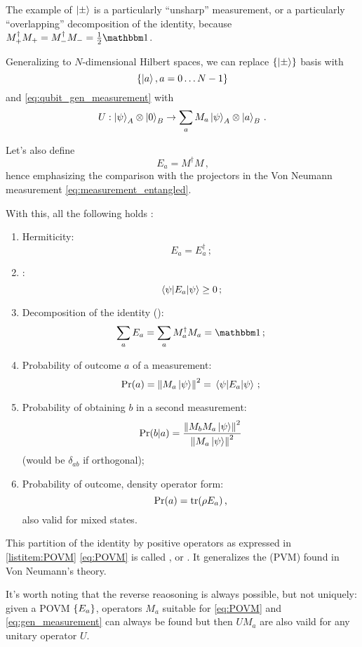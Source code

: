 The example of $\ket{\pm}$ is a particularly ``unsharp'' measurement,
or a particularly ``overlapping'' decomposition of the identity,
because $M_+^{\dagger}M_+ = M_-^{\dagger}M_- = \frac{1}{2}\idop$.

Generalizing to $N$-dimensional Hilbert spaces, we can replace
$\left\{\ket{\pm}\right\}$ basis with
\[
  \left\{\ket{a}, a = 0\ldots N-1\right\}
\]
and \eqref{eq:qubit_gen_measurement} with
\begin{equation}\label{eq:gen_measurement}
  U: \ket{\psi}_A \otimes \ket{0}_B \rightarrow \sum_a M_a\ket{\psi}_A \otimes \ket{a}_B
  \,\text{.}
\end{equation}

Let's also define
\[
  E_a = M^{\dagger}M \,\text{,}
\]
hence emphasizing the comparison with the projectors in the
Von Neumann measurement \eqref{eq:measurement_entangled}.

With this, all the following holds \parencite[Sec. 3.1]{PreskillNotes}:
\begin{enumerate}
  \item 
    Hermiticity: \[E_a = E_a^{\dagger}\,\text{;}\]
  \item
    : \[\expval{E_a}{\psi} \geq 0\,\text{;}\]  
  \item\label{listitem:POVM}
    Decomposition of the identity ():
    \begin{equation}\label{eq:POVM}
      \sum_a E_a = \sum_a M_a^{\dagger}M_a = \idop \,\text{;}
    \end{equation}
  \item
    Probability of outcome $a$ of a measurement:
    \[\Pr(a) = \norm{M_a\ket{\psi}}^2 = \expval{E_a}{\psi}\,\text{;}\]
  \item
    Probability of obtaining $b$ in a second measurement:
    \[\Pr(b|a) = \frac{\norm{M_bM_a\ket{\psi}}^2}{\norm{M_a\ket{\psi}}^2}\]
    (would be $\delta_{ab}$ if orthogonal);
  \item
    Probability of outcome, density operator form:
    \[\Pr(a) = \tr(\rho E_a)\,\text{,}\]
    also valid for mixed states.
\end{enumerate}

This partition of the identity by positive operators
as expressed in \ref{listitem:POVM} \eqref{eq:POVM} is called
, or .
It generalizes the  (PVM)
found in Von Neumann's theory.

It's worth noting that the reverse reaosoning is always possible,
but not uniquely:
given a POVM $\left\{E_a\right\}$, operators $M_a$
suitable for \eqref{eq:POVM} and \eqref{eq:gen_measurement}
can always be found \parencite[Sec. 3.1]{PreskillNotes}
but then
$UM_a$ are also vaild
for any unitary operator $U$.

